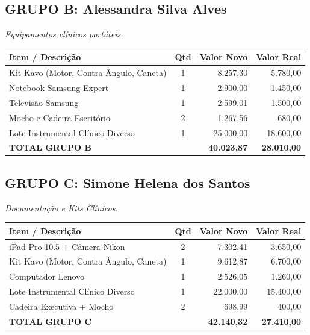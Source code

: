\documentclass[12pt, a4paper]{article}
\begin{document}
\subsection*{GRUPO B: Alessandra Silva Alves}
\textit{Equipamentos clínicos portáteis.}
\begin{longtable}{>{\raggedright\arraybackslash}p{8cm} c r r}
    \toprule
    \rowcolor{tableHeader} \textbf{Item / Descrição} & \textbf{Qtd} & \textbf{Valor Novo} & \textbf{Valor Real} \\
    \midrule
    \endhead
    \rowcolors{2}{white}{gray!10}
    Kit Kavo (Motor, Contra Ângulo, Caneta) & 1 & 8.257,30 & 5.780,00 \\
    Notebook Samsung Expert & 1 & 2.900,00 & 1.450,00 \\
    Televisão Samsung & 1 & 2.599,01 & 1.500,00 \\
    Mocho e Cadeira Escritório & 2 & 1.267,56 & 680,00 \\
    Lote Instrumental Clínico Diverso & 1 & 25.000,00 & 18.600,00 \\
    \midrule
    \rowcolor{lightGray} \textbf{TOTAL GRUPO B} & & \textbf{40.023,87} & \textbf{28.010,00} \\
    \bottomrule
\end{longtable}

\subsection*{GRUPO C: Simone Helena dos Santos}
\textit{Documentação e Kits Clínicos.}
\begin{longtable}{>{\raggedright\arraybackslash}p{8cm} c r r}
    \toprule
    \rowcolor{tableHeader} \textbf{Item / Descrição} & \textbf{Qtd} & \textbf{Valor Novo} & \textbf{Valor Real} \\
    \midrule
    \endhead
    \rowcolors{2}{white}{gray!10}
    iPad Pro 10.5 + Câmera Nikon & 2 & 7.302,41 & 3.650,00 \\
    Kit Kavo (Motor, Contra Ângulo, Caneta) & 1 & 9.612,87 & 6.700,00 \\
    Computador Lenovo & 1 & 2.526,05 & 1.260,00 \\
    Lote Instrumental Clínico Diverso & 1 & 22.000,00 & 15.400,00 \\
    Cadeira Executiva + Mocho & 2 & 698,99 & 400,00 \\
    \midrule
    \rowcolor{lightGray} \textbf{TOTAL GRUPO C} & & \textbf{42.140,32} & \textbf{27.410,00} \\
    \bottomrule
\end{longtable}
\end{document}
